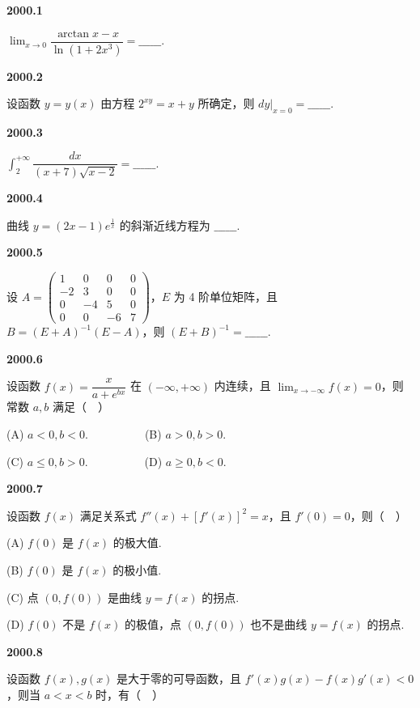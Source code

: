 \documentclass[UTF8,12pt,fontset=windows]{ctexart}
\begin{document}
{\large\bfseries 2000.1}

$\lim_{x \to 0} \dfrac{\arctan x - x}{\ln(1 + 2x^3)} = \_\_\_\_\_\_.$

\vfill
\newpage
{\large\bfseries 2000.2}

设函数 $y = y(x)$ 由方程 $2^{xy} = x + y$ 所确定，则 $\left.dy\right|_{x=0} = \_\_\_\_\_\_.$

\vfill
\newpage
{\large\bfseries 2000.3}

$\int_2^{+\infty} \dfrac{dx}{(x + 7)\sqrt{x - 2}} = \_\_\_\_\_\_.$

\vfill
\newpage
{\large\bfseries 2000.4}

曲线 $y = (2x - 1)e^{\frac{1}{x}}$ 的斜渐近线方程为 $\_\_\_\_\_\_.$

\vfill
\newpage
{\large\bfseries 2000.5}

设 $A = \begin{pmatrix} 1 & 0 & 0 & 0 \\ -2 & 3 & 0 & 0 \\ 0 & -4 & 5 & 0 \\ 0 & 0 & -6 & 7 \end{pmatrix}$，$E$ 为 4 阶单位矩阵，且 $B = (E + A)^{-1}(E - A)$，则 $(E + B)^{-1} = \_\_\_\_\_\_.$

\vfill
\newpage
{\large\bfseries 2000.6}

设函数 $f(x) = \dfrac{x}{a + e^{bx}}$ 在 $(-\infty, +\infty)$ 内连续，且 $\lim_{x \to -\infty} f(x) = 0$，则常数 $a,b$ 满足（　）

(A) $a < 0, b < 0$.　　　　　(B) $a > 0, b > 0$.

(C) $a \leqslant 0, b > 0$.　　　　　(D) $a \geqslant 0, b < 0$.

\vfill
\newpage
{\large\bfseries 2000.7}

设函数 $f(x)$ 满足关系式 $f''(x) + [f'(x)]^2 = x$，且 $f'(0) = 0$，则（　）

(A) $f(0)$ 是 $f(x)$ 的极大值.

(B) $f(0)$ 是 $f(x)$ 的极小值.

(C) 点 $(0, f(0))$ 是曲线 $y = f(x)$ 的拐点.

(D) $f(0)$ 不是 $f(x)$ 的极值，点 $(0, f(0))$ 也不是曲线 $y = f(x)$ 的拐点.

\vfill
\newpage
{\large\bfseries 2000.8}

设函数 $f(x), g(x)$ 是大于零的可导函数，且 $f'(x)g(x) - f(x)g'(x) < 0$，则当 $a < x < b$ 时，有（　）
\end{document}
